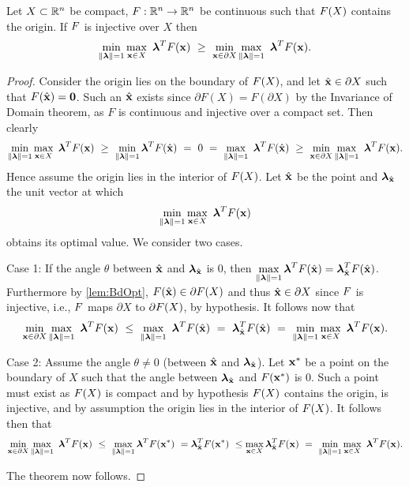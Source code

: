 \begin{thm} 
  \label{thm:MainIneq}
  Let $X\subset\mathbb{R}^n$ be compact, $F:\mathbb{R}^n\rightarrow\mathbb{R}^n$ be continuous such that $F(X)$ contains the origin. 
  If $F$ is injective over $X$ then
  \[
  \min\limits_{\lVert\boldsymbol{\lambda}\rVert=1}\max\limits_{\mathbf{x}\in X}\ \boldsymbol{\lambda}^TF(\mathbf{x}) ~\geq~ \min\limits_{\mathbf{x}\in \partial X} \max\limits_{\lVert\boldsymbol{\lambda}\rVert=1}\ \boldsymbol{\lambda}^TF(\mathbf{x}).
  \]
%
  \begin{proof}
    Consider the origin lies on the boundary of $F(X)$, and let $\hat{\mathbf{x}} \in \partial X$ such that $F(\hat{\mathbf{x}})=\mathbf{0}$. 
    Such an $\hat{\mathbf{x}}$ exists since $\partial F(X) = F(\partial X)$ by the Invariance of Domain theorem, as $F$ is continuous and injective over a compact set. 
    Then  clearly
    \[
    \min\limits_{\norm{\vlambda}=1}\max\limits_{\vx\in X}\ \vlambda^T\vF(\vx) ~\geq~
    \min\limits_{\norm{\vlambda}=1}\vlambda^T\vF(\hat{\vx}) ~=~ 0 ~=~
    \max\limits_{\norm{\vlambda}=1}\ \vlambda^T\vF(\hat{\vx}) ~\geq~
    \min\limits_{\vx\in \partial X}\max\limits_{\norm{\vlambda}=1}\ \vlambda^T\vF(\vx).
\]
Hence assume the origin lies in the interior of $F(X)$.
Let $\hat{\mathbf{x}}$ be the point and $\boldsymbol{\lambda}_{\hat{\mathbf{x}}}$ the unit vector at which
\[
\min\limits_{\lVert\boldsymbol{\lambda}\rVert=1}\max\limits_{\mathbf{x}\in X}\ \boldsymbol{\lambda}^TF(\mathbf{x})
\]
obtains its optimal value.
We consider two cases.

Case 1: If the angle $\theta$ between $\hat{\mathbf{x}}$ and $\boldsymbol{\lambda}_{\hat{\mathbf{x}}}$ is $0$, then $\displaystyle \max\limits_{\lVert\boldsymbol{\lambda}\rVert=1}\boldsymbol{\lambda}^TF(\hat{\mathbf{x}}) = \boldsymbol{\lambda}_{\hat{\mathbf{x}}}^TF(\hat{\mathbf{x}})$. 
Furthermore by \cref{lem:BdOpt}, $F(\hat{\mathbf{x}}) \in \partial F(X)$ and thus $\hat{\mathbf{x}}\in \partial X$ since $F$ is injective, i.e., $F$ maps $\partial X$ to $\partial F(X)$, by hypothesis. 
It follows now that
\[
\min\limits_{\vx\in \partial X}\max\limits_{\norm{\vlambda}=1}\ \vlambda^T\vF(\vx) ~\leq~
\max\limits_{\norm{\vlambda}=1}\ \vlambda^T\vF(\hat{\vx}) ~=~
\vlambda_{\hat{\vx}}^T\vF(\hat{\vx}) ~=~
\min\limits_{\norm{\vlambda}=1}\max\limits_{\vx\in X}\ \vlambda^T\vF(\vx).
\]

Case 2: Assume the angle $\theta \neq 0$ (between $\hat{\mathbf{x}}$ and $\boldsymbol{\lambda}_{\hat{\mathbf{x}}}$). 
Let $\mathbf{x}^*$ be a point on the boundary of $X$ such that the angle between $\boldsymbol{\lambda}_{\hat{\mathbf{x}}}$ and $F(\mathbf{x}^*)$ is 0. 
Such a point must exist as $F(X)$ is compact and by hypothesis $F(X)$ contains the origin, is injective,
and by assumption the origin lies in the interior of $F(X)$. 
It follows then that
\[
\min\limits_{\vx\in \partial X}\max\limits_{\norm{\vlambda}=1}\ \vlambda^T\vF(\vx) ~\leq~
\max\limits_{\norm{\vlambda}=1}\vlambda^T \vF(\vx^*) ~=
\vlambda_{\hat{\vx}}^T\vF(\vx^*) ~\leq
\max\limits_{\vx\in X}\vlambda_{\hat{\vx}}^T\vF(\vx) ~=~
\min\limits_{\norm{\vlambda}=1}\max\limits_{\vx\in X}\ \vlambda^T\vF(\vx).
\]

The theorem now follows.
\end{proof}
\end{thm}

